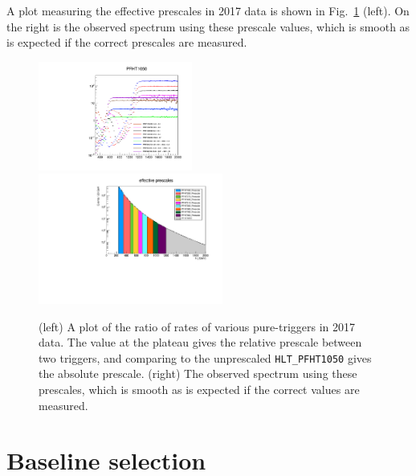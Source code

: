 A plot measuring the effective prescales in 2017 data is shown in Fig.~\ref{fig:pureht_prescales} (left).
On the right is the observed \Ht spectrum using these prescale values, which is smooth as
is expected if the correct prescales are measured.

\begin{figure}[t]
  \begin{center}
    \includegraphics[width=0.45\textwidth]{figs/event_selection/prescales_2017.pdf}
    \includegraphics[width=0.54\textwidth]{figs/event_selection/htSpect2017_meth1.pdf} \\
    \caption{(left) A plot of the ratio of rates of various pure-\Ht triggers in
      2017 data. The value at the plateau gives the relative prescale between two triggers,
      and comparing to the unprescaled \texttt{HLT\_PFHT1050} gives the absolute prescale.
      (right) The observed \Ht spectrum using these prescales, which is smooth as is expected 
      if the correct values are measured.
            }
    \label{fig:pureht_prescales}
  \end{center}
\end{figure}

\section{Baseline selection}
\label{sec:baselinesel}

